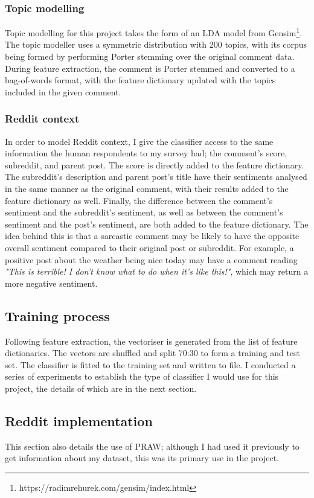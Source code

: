 \documentclass[a4paper,12pt]{article}
\begin{document}
\subsubsection{Topic modelling}
Topic modelling for this project takes the form of an LDA model from Gensim\footnote{https://radimrehurek.com/gensim/index.html}. The topic modeller uses a symmetric distribution with 200 topics, with its corpus being formed by performing Porter stemming over the original comment data. During feature extraction, the comment is Porter stemmed and converted to a bag-of-words format, with the feature dictionary updated with the topics included in the given comment.

\subsubsection{Reddit context}
In order to model Reddit context, I give the classifier access to the same information the human respondents to my survey had; the comment's score, subreddit, and parent post. The score is directly added to the feature dictionary. The subreddit's description and parent post's title have their sentiments analysed in the same manner as the original comment, with their results added to the feature dictionary as well. Finally, the difference between the comment's sentiment and the subreddit's sentiment, as well as between the comment's sentiment and the post's sentiment, are both added to the feature dictionary. The idea behind this is that a sarcastic comment may be likely to have the opposite overall sentiment compared to their original post or subreddit. For example, a positive post about the weather being nice today may have a comment reading \textit{"This is terrible! I don't know what to do when it's like this!"}, which may return a more negative sentiment.

\subsection{Training process}
Following feature extraction, the vectoriser is generated from the list of feature dictionaries. The vectors are shuffled and split 70:30 to form a training and test set. The classifier is fitted to the training set and written to file. I conducted a series of experiments to establish the type of classifier I would use for this project, the details of which are in the next section.

\subsection{Reddit implementation}
This section also details the use of PRAW; although I had used it previously to get information about my dataset, this was its primary use in the project.
\end{document}
